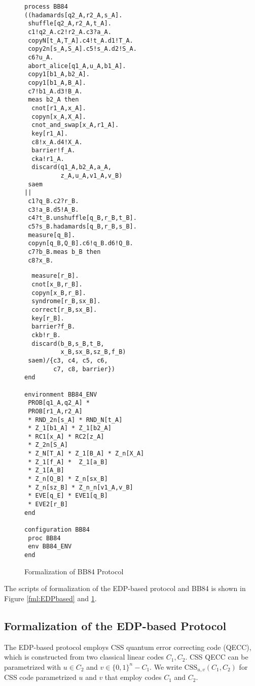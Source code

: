 \begin{figure}
\begin{minipage}{0.5\hsize}
\begin{verbatim}
process BB84
((hadamards[q2_A,r2_A,s_A].
 shuffle[q2_A,r2_A,t_A].
 c1!q2_A.c2!r2_A.c3?a_A.
 copyN[t_A,T_A].c4!t_A.d1!T_A.
 copy2n[s_A,S_A].c5!s_A.d2!S_A.
 c6?u_A.
 abort_alice[q1_A,u_A,b1_A].
 copy1[b1_A,b2_A].
 copy1[b1_A,B_A].
 c7!b1_A.d3!B_A.
 meas b2_A then 
  cnot[r1_A,x_A].
  copyn[x_A,X_A].
  cnot_and_swap[x_A,r1_A].
  key[r1_A].
  c8!x_A.d4!X_A.
  barrier!f_A.
  cka!r1_A.
  discard(q1_A,b2_A,a_A,
          z_A,u_A,v1_A,v_B)
 saem
||
 c1?q_B.c2?r_B.
 c3!a_B.d5!A_B.
 c4?t_B.unshuffle[q_B,r_B,t_B].
 c5?s_B.hadamards[q_B,r_B,s_B].
 measure[q_B].
 copyn[q_B,Q_B].c6!q_B.d6!Q_B.
 c7?b_B.meas b_B then
 c8?x_B.
\end{verbatim}
\end{minipage}
\begin{minipage}{0.5\hsize}
\begin{verbatim}
  measure[r_B].
  cnot[x_B,r_B].
  copyn[x_B,r_B].
  syndrome[r_B,sx_B].
  correct[r_B,sx_B].
  key[r_B].
  barrier?f_B.
  ckb!r_B.
  discard(b_B,s_B,t_B,
          x_B,sx_B,sz_B,f_B)
 saem)/{c3, c4, c5, c6,
        c7, c8, barrier})
end

environment BB84_ENV
 PROB[q1_A,q2_A] *
 PROB[r1_A,r2_A]
 * RND_2n[s_A] * RND_N[t_A]
 * Z_1[b1_A] * Z_1[b2_A]
 * RC1[x_A] * RC2[z_A] 
 * Z_2n[S_A]
 * Z_N[T_A] * Z_1[B_A] * Z_n[X_A]
 * Z_1[f_A] *  Z_1[a_B] 
 * Z_1[A_B]
 * Z_n[Q_B] * Z_n[sx_B]
 * Z_n[sz_B] * Z_n_n[v1_A,v_B]
 * EVE[q_E] * EVE1[q_B]
 * EVE2[r_B]
end

configuration BB84
 proc BB84
 env BB84_ENV
end
\end{verbatim}
\end{minipage}
\caption{Formalization of BB84 Protocol}
\label{fml:BB84}
\end{figure}

The scripts of formalization of 
the EDP-based protocol and BB84 is shown in
Figure \ref{fml:EDPbased} and \ref{fml:BB84}.

\subsection{Formalization of the EDP-based Protocol}
The EDP-based protocol employs CSS quantum error correcting code (QECC),
which
is constructed from two classical linear codes $C_1, C_2$.
CSS QECC can be parametrized with $u \in C_2$ and 
$v \in \{0,1\}^n - C_1$.
We write $\mathrm{CSS}_{u,v}(C_1,C_2)$ for CSS code parametrized $u$ and
$v$ that employ codes $C_1$ and $C_2$.

